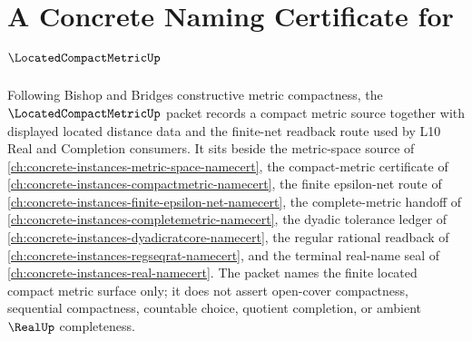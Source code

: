 \chapter{A Concrete Naming Certificate for $\LocatedCompactMetricUp$}
\label{ch:concrete-instances-located-compact-metric-namecert}

Following Bishop and Bridges constructive metric compactness, the $\LocatedCompactMetricUp$ packet records a compact metric source together with displayed located distance data and the finite-net readback route used by L10 Real and Completion consumers. It sits beside the metric-space source of \autoref{ch:concrete-instances-metric-space-namecert}, the compact-metric certificate of \autoref{ch:concrete-instances-compactmetric-namecert}, the finite epsilon-net route of \autoref{ch:concrete-instances-finite-epsilon-net-namecert}, the complete-metric handoff of \autoref{ch:concrete-instances-completemetric-namecert}, the dyadic tolerance ledger of \autoref{ch:concrete-instances-dyadicratcore-namecert}, the regular rational readback of \autoref{ch:concrete-instances-regseqrat-namecert}, and the terminal real-name seal of \autoref{ch:concrete-instances-real-namecert}. The packet names the finite located compact metric surface only; it does not assert open-cover compactness, sequential compactness, countable choice, quotient completion, or ambient $\RealUp$ completeness.

